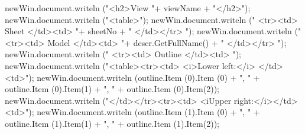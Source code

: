 \documentclass[]{article}
\newenvironment{Shaded}{}{}
\newcommand{\DecValTok}[1]{\textcolor[rgb]{0.25,0.63,0.44}{{#1}}}
\newcommand{\StringTok}[1]{\textcolor[rgb]{0.25,0.44,0.63}{{#1}}}
\newcommand{\OtherTok}[1]{\textcolor[rgb]{0.00,0.44,0.13}{{#1}}}
\newcommand{\FunctionTok}[1]{\textcolor[rgb]{0.02,0.16,0.49}{{#1}}}
\newcommand{\NormalTok}[1]{{#1}}
\begin{document}
\begin{Shaded}
\begin{Highlighting}[]
      \OtherTok{newWin}\NormalTok{.}\OtherTok{document}\NormalTok{.}\FunctionTok{writeln} \NormalTok{(}\StringTok{"<h2>View "}\NormalTok{+ viewName + }\StringTok{"</h2>"}\NormalTok{);}
      \OtherTok{newWin}\NormalTok{.}\OtherTok{document}\NormalTok{.}\FunctionTok{writeln} \NormalTok{(}\StringTok{"<table>"}\NormalTok{);}
      \OtherTok{newWin}\NormalTok{.}\OtherTok{document}\NormalTok{.}\FunctionTok{writeln} \NormalTok{(}\StringTok{" <tr><td> Sheet </td><td> "}\NormalTok{+ }
                   \NormalTok{sheetNo + }\StringTok{" </td></tr> "}\NormalTok{);}
      \OtherTok{newWin}\NormalTok{.}\OtherTok{document}\NormalTok{.}\FunctionTok{writeln} \NormalTok{(}\StringTok{"  <tr><td> Model </td><td> "}\NormalTok{+ }
                   \OtherTok{descr}\NormalTok{.}\FunctionTok{GetFullName}\NormalTok{() + }\StringTok{" </td></tr> "}\NormalTok{);}
      \OtherTok{newWin}\NormalTok{.}\OtherTok{document}\NormalTok{.}\FunctionTok{writeln} \NormalTok{(}\StringTok{" <tr><td> Outline </td><td> "}\NormalTok{);}
      \OtherTok{newWin}\NormalTok{.}\OtherTok{document}\NormalTok{.}\FunctionTok{writeln} \NormalTok{(}\StringTok{"<table><tr><td> <i>Lower left:</i> </td><td>"}\NormalTok{);}
      \OtherTok{newWin}\NormalTok{.}\OtherTok{document}\NormalTok{.}\FunctionTok{writeln} \NormalTok{(}\OtherTok{outline}\NormalTok{.}\FunctionTok{Item} \NormalTok{(}\DecValTok{0}\NormalTok{).}\FunctionTok{Item} \NormalTok{(}\DecValTok{0}\NormalTok{) + }\StringTok{", "} \NormalTok{+ }
                   \OtherTok{outline}\NormalTok{.}\FunctionTok{Item} \NormalTok{(}\DecValTok{0}\NormalTok{).}\FunctionTok{Item}\NormalTok{(}\DecValTok{1}\NormalTok{) + }\StringTok{", "} \NormalTok{+ }
                   \OtherTok{outline}\NormalTok{.}\FunctionTok{Item} \NormalTok{(}\DecValTok{0}\NormalTok{).}\FunctionTok{Item}\NormalTok{(}\DecValTok{2}\NormalTok{));}
      \OtherTok{newWin}\NormalTok{.}\OtherTok{document}\NormalTok{.}\FunctionTok{writeln} \NormalTok{(}\StringTok{"</td></tr><tr><td> <iUpper right:</i></td><td>"}\NormalTok{);}
      \OtherTok{newWin}\NormalTok{.}\OtherTok{document}\NormalTok{.}\FunctionTok{writeln} \NormalTok{(}\OtherTok{outline}\NormalTok{.}\FunctionTok{Item} \NormalTok{(}\DecValTok{1}\NormalTok{).}\FunctionTok{Item} \NormalTok{(}\DecValTok{0}\NormalTok{) + }\StringTok{", "} \NormalTok{+ }
                   \OtherTok{outline}\NormalTok{.}\FunctionTok{Item} \NormalTok{(}\DecValTok{1}\NormalTok{).}\FunctionTok{Item}\NormalTok{(}\DecValTok{1}\NormalTok{) + }\StringTok{", "} \NormalTok{+ }
                   \OtherTok{outline}\NormalTok{.}\FunctionTok{Item} \NormalTok{(}\DecValTok{1}\NormalTok{).}\FunctionTok{Item}\NormalTok{(}\DecValTok{2}\NormalTok{));}

\end{Highlighting}
\end{Shaded}
\end{document}
